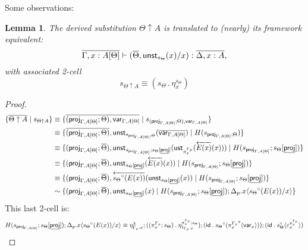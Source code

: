 \documentclass[10pt]{article}
\newtheorem{lemma}{Lemma}
\theoremstyle{definition}
\newcommand{\yields}{\vdash}
\newcommand{\rewrite}[2]{\overleftarrow{#1}(#2)}
\newcommand\UStI[2]{\ensuremath{\mathsf{ust}_{#1}(#2)}}
\newcommand\UnSt[2]{\ensuremath{\mathsf{unst}_{#1}(#2)}}
\newcommand\TrCirc[2]{\ensuremath{{#1}^\circ(#2)}}
\newcommand\proj[1]{\ensuremath{\mathsf{proj}_{#1}}}
\newcommand\var[1]{\ensuremath{\mathsf{var}_{#1}}}
\newcommand{\id}{\mathsf{id}}
\newcommand\ap[2]{\ensuremath{#1 \langle #2 \rangle }}
\newcommand\bdot[0]{\mathbin{.}}
\begin{document}
Some observations:
\begin{lemma}\label{lemma:uparrow-translation}
The derived substitution $\Theta \uparrow A$ is translated to (nearly) its framework equivalent: \[\upstairs{\Gamma, x : A[\Theta]} \yields (\upstairs{\Theta}, \UnSt{ s_{\Theta}}{x}/x) : \upstairs{\Delta, x : A},\]
with associated 2-cell \[s_{\Theta \uparrow A} \equiv (s_\Theta \bdot \eta^{s_\Theta}_x)\]
\end{lemma}
\begin{proof}
\begin{align*}
\{ \upstairs{\Theta \uparrow A} \mid s_{\Theta \uparrow A} \}
&\equiv \{\upstairs{(\proj{\Gamma, A[\Theta]}; \Theta) , \var{\Gamma, A[\Theta]}} \mid s_{(\proj{\Gamma, A[\Theta]}; \Theta) , \var{\Gamma, A[\Theta]}} \}\\
&\equiv \{ \upstairs{(\proj{\Gamma, A[\Theta]}; \Theta)} , \UnSt{s_{\proj{\Gamma, A[\Theta]}; \Theta}}{\upstairs{\var{\Gamma, A[\Theta]}}} \mid H(s_{\proj{\Gamma, A[\Theta]}; \Theta}) \} \\
&\equiv \{ (\proj{\Gamma, A[\Theta]};  \upstairs{\Theta}) , \UnSt{s_{\proj{\Gamma, A[\Theta]}} ; s_{\Theta}[\downstairs{\mathsf{proj}}]}{\UStI{\pi^{\asdep{\Gamma}}_x}{\rewrite{E(x)}{x}}} \mid H(s_{\proj{\Gamma, A[\Theta]}};s_\Theta[\downstairs{\mathsf{proj}}]) \}\\
&\equiv \{ (\proj{\Gamma, A[\Theta]};  \upstairs{\Theta}) , \UnSt{ s_{\Theta}[\downstairs{\mathsf{proj}}]}{\rewrite{E(x)}{x}} \mid H(s_{\proj{\Gamma, A[\Theta]}};s_\Theta[\downstairs{\mathsf{proj}}]) \}\\
&\equiv \{ (\proj{\Gamma, A[\Theta]};  \upstairs{\Theta}) , \rewrite{\TrCirc{s_\Theta}{E(x)}}{\UnSt{ s_{\Theta}[\downstairs{\mathsf{proj}}]}{x}} \mid H(s_{\proj{\Gamma, A[\Theta]}};s_\Theta[\downstairs{\mathsf{proj}}]) \}\\
&\sim \{ (\proj{\Gamma, A[\Theta]};  \upstairs{\Theta}) , \UnSt{ s_{\Theta}[\downstairs{\mathsf{proj}}]}{x} \mid H(s_{\proj{\Gamma, A[\Theta]}};s_\Theta[\downstairs{\mathsf{proj}}]) ; \ap{\asdep{\Delta}.x}{\TrCirc{s_\Theta}{E(x)}/x} \}
\end{align*}
This last 2-cell is:
\begin{align*}
H(s_{\proj{\Gamma, A[\Theta]}};s_\Theta[\downstairs{\mathsf{proj}}]) ; \ap{\asdep{\Delta}.x}{\TrCirc{s_\Theta}{E(x)}/x} 
&\equiv \eta^\chi_{\asdep{\Gamma}.x} ; ((\pi^{\asdep{\Gamma}}_x;s_\Theta) \bdot \eta^{\pi^{\asdep{\Gamma}}_x;s_\Theta}_{1_{\asdep{\Gamma}.x}}) ; (\id \bdot \TrCirc{s_\Theta}{\ap{{\pi^{\asdep{\Gamma}}_x}^\circ}{\var{x}}}) ; (\id \bdot \ap{s_\Theta^\circ}{\varepsilon^{\pi^{\asdep{\Gamma}}_x}_x}) \\

\end{align*}
\end{proof}
\end{document}
